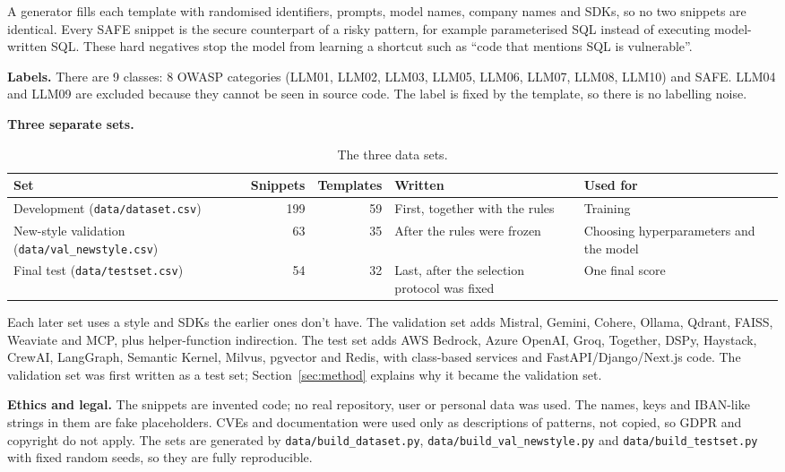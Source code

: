 \documentclass[11pt,a4paper]{article}
\newcommand{\code}[1]{\texttt{#1}}
\begin{document}
A generator fills each template with randomised identifiers, prompts, model names,
company names and SDKs, so no two snippets are identical. Every SAFE snippet is the
secure counterpart of a risky pattern, for example parameterised SQL instead of executing
model-written SQL. These hard negatives stop the model from learning a shortcut such as
``code that mentions SQL is vulnerable''.

\textbf{Labels.} There are 9 classes: 8 OWASP categories (LLM01, LLM02, LLM03, LLM05,
LLM06, LLM07, LLM08, LLM10) and SAFE. LLM04 and LLM09 are excluded because they cannot be
seen in source code. The label is fixed by the template, so there is no labelling noise.

\textbf{Three separate sets.}

\begin{table}[H]
\centering\small
\begin{tabularx}{\linewidth}{>{\raggedright\arraybackslash}X r r >{\raggedright\arraybackslash}p{3.4cm} >{\raggedright\arraybackslash}p{3.3cm}}
\toprule
Set & Snippets & Templates & Written & Used for \\
\midrule
Development (\code{data/dataset.csv}) & 199 & 59 & First, together with the rules & Training \\
New-style validation (\code{data/val\_newstyle.csv}) & 63 & 35 & After the rules were frozen & Choosing hyperparameters and the model \\
Final test (\code{data/testset.csv}) & 54 & 32 & Last, after the selection protocol was fixed & One final score \\
\bottomrule
\end{tabularx}
\caption{The three data sets.}
\end{table}

Each later set uses a style and SDKs the earlier ones don't have. The validation set adds
Mistral, Gemini, Cohere, Ollama, Qdrant, FAISS, Weaviate and MCP, plus helper-function
indirection. The test set adds AWS Bedrock, Azure OpenAI, Groq, Together, DSPy, Haystack,
CrewAI, LangGraph, Semantic Kernel, Milvus, pgvector and Redis, with class-based services
and FastAPI/Django/Next.js code. The validation set was first written as a test set;
Section~\ref{sec:method} explains why it became the validation set.

\textbf{Ethics and legal.} The snippets are invented code; no real repository, user or
personal data was used. The names, keys and IBAN-like strings in them are fake
placeholders. CVEs and documentation were used only as descriptions of patterns, not
copied, so GDPR and copyright do not apply. The sets are generated by
\code{data/build\_dataset.py}, \code{data/build\_val\_newstyle.py} and
\code{data/build\_testset.py} with fixed random seeds, so they are fully reproducible.
\end{document}
